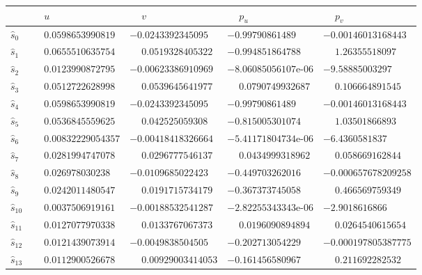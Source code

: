 \documentclass[1p]{article}
\begin{document}
\begin{table}[H]
	\scriptsize
    \centering
    \begin{tabular}{lllll}
        \hline
         & $\phantom{-}u$ & $\phantom{-}v$ & $\phantom{-}p_u$ & $\phantom{-}p_v$ \\
        \hline
        $\hat{s}_{0}$ & $\phantom{-}0.0598653990819$ & $-0.0243392345095$ & $-0.99790861489$ & $-0.00146013168443$ \\
        $\hat{s}_{1}$ & $\phantom{-}0.0655510635754$ & $\phantom{-}0.0519328405322$ & $-0.994851864788$ & $\phantom{-}1.26355518097$ \\
        $\hat{s}_{2}$ & $\phantom{-}0.0123990872795$ & $-0.00623386910969$ & $-8.06085056107$e-06 & $-9.58885003297$ \\
        $\hat{s}_{3}$ & $\phantom{-}0.0512722628998$ & $\phantom{-}0.0539645641977$ & $\phantom{-}0.0790749932687$ & $\phantom{-}0.106664891545$ \\
        $\hat{s}_{4}$ & $\phantom{-}0.0598653990819$ & $-0.0243392345095$ & $-0.99790861489$ & $-0.00146013168443$ \\
        $\hat{s}_{5}$ & $\phantom{-}0.0536845559625$ & $\phantom{-}0.042525059308$ & $-0.815005301074$ & $\phantom{-}1.03501866893$ \\
        $\hat{s}_{6}$ & $\phantom{-}0.00832229054357$ & $-0.00418418326664$ & $-5.41171804734$e-06 & $-6.4360581837$ \\
        $\hat{s}_{7}$ & $\phantom{-}0.0281994747078$ & $\phantom{-}0.0296777546137$ & $\phantom{-}0.0434999318962$ & $\phantom{-}0.058669162844$ \\
        $\hat{s}_{8}$ & $\phantom{-}0.026978030238$ & $-0.0109685022423$ & $-0.449703262016$ & $-0.000657678209258$ \\
        $\hat{s}_{9}$ & $\phantom{-}0.0242011480547$ & $\phantom{-}0.0191715734179$ & $-0.367373745058$ & $\phantom{-}0.466569759349$ \\
        $\hat{s}_{10}$ & $\phantom{-}0.0037506919161$ & $-0.00188532541287$ & $-2.82255343343$e-06 & $-2.9018616866$ \\
        $\hat{s}_{11}$ & $\phantom{-}0.0127077970338$ & $\phantom{-}0.0133767067373$ & $\phantom{-}0.0196090894894$ & $\phantom{-}0.0264540615654$ \\
        $\hat{s}_{12}$ & $\phantom{-}0.0121439073914$ & $-0.0049838504505$ & $-0.202713054229$ & $-0.000197805387775$ \\
        $\hat{s}_{13}$ & $\phantom{-}0.0112900526678$ & $\phantom{-}0.00929003414053$ & $-0.161456580967$ & $\phantom{-}0.211692282532$ \\

\end{tabular}
\end{table}
\end{document}
